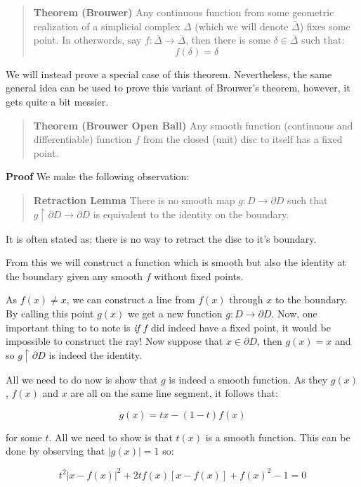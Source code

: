 \documentclass[letterpaper,12pt]{article}
\newcommand{\ol}{\overline}
\begin{document}
\begin{quote}
    \textbf{Theorem (Brouwer)} Any continuous function from some geometric realization of a simplicial complex $\Delta$ (which we will denote $\ol{\Delta}$) fixes some point. In otherwords, say $f : \ol{\Delta} \to \ol{\Delta}$, then there is some $\delta \in \ol{\Delta}$ such that:
    $$f(\delta) = \delta$$
\end{quote}

We will instead prove a special case of this theorem. Nevertheless, the same general idea can be used to prove this variant of Brouwer's theorem, however, it gets quite a bit messier.

\begin{quote}
    \textbf{Theorem (Brouwer Open Ball)} Any smooth function (continuous and differentiable) function $f$ from the closed (unit) disc to itself has a fixed point.
\end{quote}

\textbf{Proof} We make the following observation: 

\begin{quote}
    \textbf{Retraction Lemma} There is no smooth map $g : D \to \partial D$ such that $g \upharpoonright \partial D \to \partial D$ is equivalent to the identity on the boundary.
\end{quote}

It is often stated as: there is no way to retract the disc to it's boundary.

From this we will construct a function which is smooth but also the identity at the boundary given any smooth $f$ without fixed points.

As $f(x) \neq x$, we can construct a line from $f(x)$ through $x$ to the boundary. By calling this point $g(x)$ we get a new function $g : D \to \partial D$. Now, one important thing to to note is \textit{if} $f$ did indeed have a fixed point, it would be impossible to construct the ray! Now suppose that $x \in \partial D$, then $g(x) = x$ and so $g \upharpoonright \partial D$ is indeed the identity.

All we need to do now is show that $g$ is indeed a smooth function. As they $g(x)$, $f(x)$ and $x$ are all on the same line segment, it follows that:

$$g(x) = tx - (1 - t)f(x)$$

for some $t$. All we need to show is that $t(x)$ is a smooth function. This can be done by observing that $|g(x)| = 1$ so:

$$t^2|x - f(x)|^2 + 2tf(x)[x - f(x)] + f(x)^2 - 1 = 0$$
\end{document}
